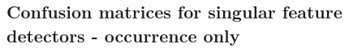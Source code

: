 \begin{comment}
	\end{minipage} 	
	\begin{minipage}{.5\linewidth}
		\centering
		\caption{Numerical}
		\begin{tabular}{| c | c | c |}
			\hline
			Actual 		& Predicted: -1	& Predicted: 1	\\ \hline
			-1			& 1591			& 403			\\ \hline
			1			& 375			& 1631			\\ \hline
		\end{tabular}
	\end{minipage}%
	\begin{minipage}{.5\linewidth}
		\caption{Tags}
		\centering
		\begin{tabular}{| c | c | c |}
			\hline
			Actual 		& Predicted: -1	& Predicted: 1	\\ \hline
			-1			& 1508			& 486			\\ \hline
			1			& 467			& 1539			\\ \hline
		\end{tabular}
	\end{minipage}
\end{table}	

\end{comment}

\clearpage
\subsection{Confusion matrices for singular feature detectors - occurrence only}
\label{app:conf_matrix_singular_only}

